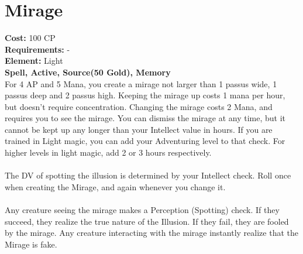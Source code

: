 \section{Mirage}
\textbf{Cost:} 100 CP\\
\textbf{Requirements:} -\\
\textbf{Element:} Light\\
\textbf{Spell, Active, Source(50 Gold), Memory}\\
For 4 AP and 5 Mana, you create a mirage not larger than 1 passus wide, 1 passus deep and 2 passus high. Keeping the mirage up costs 1 mana per hour, but doesn't require concentration. Changing the mirage costs 2 Mana, and requires you to see the mirage. You can dismiss the mirage at any time, but it cannot be kept up any longer than your Intellect value in hours. If you are trained in Light magic, you can add your Adventuring level to that check. For higher levels in light magic, add 2 or 3 hours respectively.\\
\\
The DV of spotting the illusion is determined by your Intellect check. Roll once when creating the Mirage, and again whenever you change it. \\
\\
Any creature seeing the mirage makes a Perception (Spotting) check. If they succeed, they realize the true nature of the Illusion. If they fail, they are fooled by the mirage. Any creature interacting with the mirage instantly realize that the Mirage is fake.\\